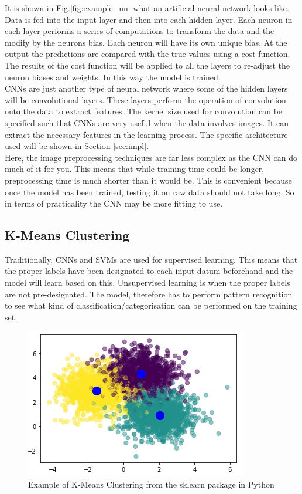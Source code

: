 \documentclass{article}
\begin{document}
    It is shown in Fig.\ref{fig:example_nn} what an artificial neural network looks like. Data is fed into the input layer and then into each hidden layer. Each neuron in each layer performs a series of computations to transform the data and the modify by the neurons bias. Each neuron will have its own unique bias. At the output the predictions are compared with the true values using a cost function. The results of the cost function will be applied to all the layers to re-adjust the neuron biases and weights. In this way the model is trained.\\
    
    CNNs are just another type of neural network where some of the hidden layers will be convolutional layers. These layers perform the operation of convolution onto the data to extract features. The kernel size used for convolution can be specified such that CNNs are very useful when the data involves images. It can extract the necessary features in the learning process. The specific architecture used will be shown in Section \ref{sec:impl}.\\
    
    Here, the image preprocessing techniques are far less complex as the CNN can do much of it for you. This means that while training time could be longer, preprocessing time is much shorter than it would be. This is convenient because once the model has been trained, testing it on raw data should not take long. So in terms of practicality the CNN may be more fitting to use.\\
    
    \subsection{K-Means Clustering}
    Traditionally, CNNs and SVMs are used for supervised learning. This means that the proper labels have been designated to each input datum beforehand and the model will learn based on this. Unsupervised learning is when the proper labels are not pre-designated. The model, therefore has to perform pattern recognition to see what kind of classification/categorisation can be performed on the training set.\\
    \begin{figure}[htb]
    	\centering
    	\includegraphics[scale=0.7]{Figures/Example_KMeans.PNG}
    	\caption{Example of K-Means Clustering from the sklearn package in Python}
    	\label{fig:example_kmeans}
    \end{figure} 
\end{document}
